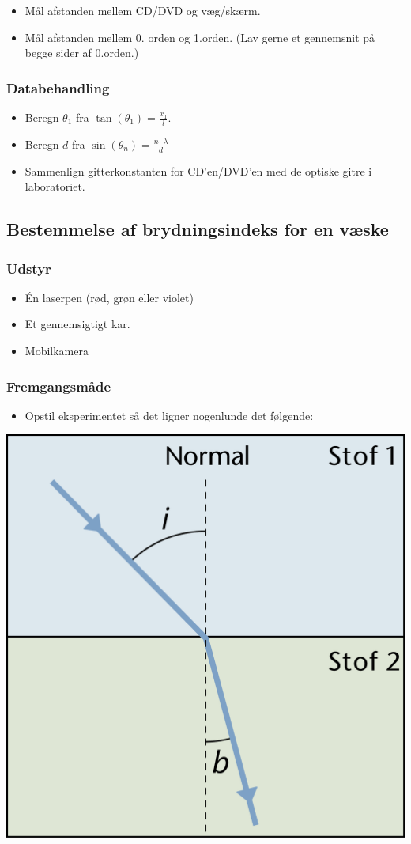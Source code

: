 \documentclass[a4paper, 12pt]{article}
\begin{document}
\begin{itemize}
\item Mål afstanden mellem CD/DVD og væg/skærm.
\item Mål afstanden mellem 0. orden og 1.orden. (Lav gerne et gennemsnit på begge sider af 0.orden.)
\end{itemize}

\subsubsection*{Databehandling}
\label{sec:orgcdd7465}
\begin{itemize}
\item Beregn \(\theta_1\) fra \(\tan \left( \theta_1 \right) = \frac{x_1}{l}\).
\item Beregn \(d\) fra \(\sin \left( \theta_{n} \right) = \frac{n \cdot \lambda}{d}\)
\item Sammenlign gitterkonstanten for CD'en/DVD'en med de optiske gitre i laboratoriet.
\end{itemize}

\newpage
\subsection*{Bestemmelse af brydningsindeks for en væske}
\label{sec:org8a49f6c}
\subsubsection*{Udstyr}
\label{sec:org377a930}
\begin{itemize}
\item Én laserpen (rød, grøn eller violet)
\item Et gennemsigtigt kar.
\item Mobilkamera
\end{itemize}
\subsubsection*{Fremgangsmåde}
\label{sec:orgecfabf0}
\begin{itemize}
\item Opstil eksperimentet så det ligner nogenlunde det følgende:
\end{itemize}

\begin{center}
\includegraphics[width=0.5\linewidth]{./img/brydningsindeks_vaeske.png}
\end{center}
\end{document}
